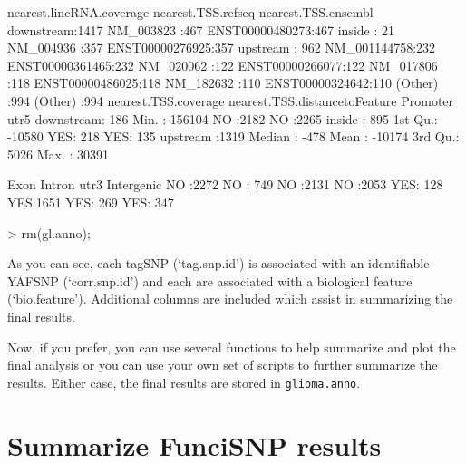 \documentclass[12pt,fullpage]{article}
\newcommand{\Robject}[1]{{\texttt{#1}}}
\begin{document}
\begin{Schunk}
\begin{Soutput}
 nearest.lincRNA.coverage    nearest.TSS.refseq      nearest.TSS.ensembl
 downstream:1417          NM_003823   :467      ENST00000480273:467     
 inside    :  21          NM_004936   :357      ENST00000276925:357     
 upstream  : 962          NM_001144758:232      ENST00000361465:232     
                          NM_020062   :122      ENST00000266077:122     
                          NM_017806   :118      ENST00000486025:118     
                          NM_182632   :110      ENST00000324642:110     
                          (Other)     :994      (Other)        :994     
 nearest.TSS.coverage nearest.TSS.distancetoFeature Promoter    utr5     
 downstream: 186      Min.   :-156104               NO :2182   NO :2265  
 inside    : 895      1st Qu.: -10580               YES: 218   YES: 135  
 upstream  :1319      Median :   -478                                    
                      Mean   : -10174                                    
                      3rd Qu.:   5026                                    
                      Max.   :  30391                                    
                                                                         
  Exon      Intron      utr3      Intergenic
 NO :2272   NO : 749   NO :2131   NO :2053  
 YES: 128   YES:1651   YES: 269   YES: 347  
\end{Soutput}
\begin{Sinput}
> rm(gl.anno);
\end{Sinput}
\end{Schunk}

As you can see, each tagSNP (`tag.snp.id') is associated with an identifiable
YAFSNP (`corr.snp.id') and each are associated with a biological feature
(`bio.feature'). Additional columns are included which assist in summarizing the
final results.

Now, if you prefer, you can use several functions to help summarize and plot
the final analysis or you can use your own set of scripts to further summarize
the results.  Either case, the final results are stored in
\Robject{glioma.anno}.

\section{Summarize FunciSNP results}
\end{document}
